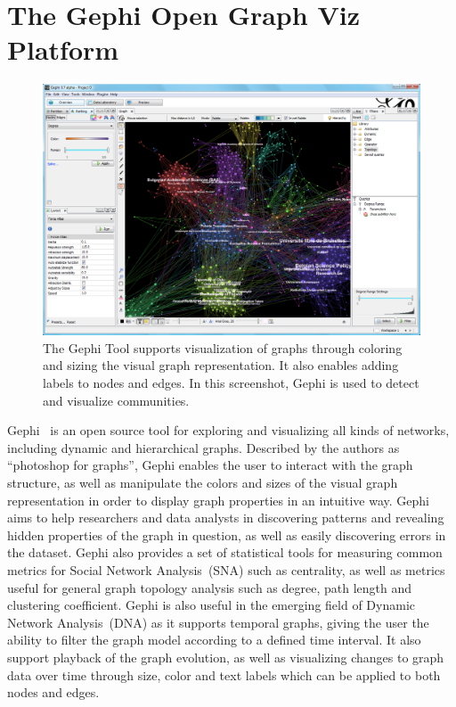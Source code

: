 \section{The Gephi Open Graph Viz Platform}

\begin{figure}
    \centering
    \includegraphics[width=\textwidth]{img/gephi1}
    \caption{The Gephi Tool supports
        visualization of graphs through coloring and sizing the visual
        graph
        representation. It also enables adding labels to nodes and
        edges. In
        this screenshot, Gephi is used to detect and visualize
    communities.}
\label{img:gephi1}
\end{figure}

Gephi~\cite{ICWSM09154} is an open source tool for exploring and
visualizing all kinds of networks, including dynamic and hierarchical
graphs. Described by the authors as ``photoshop for graphs'', Gephi
enables the user to interact with the graph structure, as well as
manipulate the colors and sizes of the visual graph representation in
order to display graph properties in an intuitive way. Gephi aims to
help researchers and data analysts in discovering patterns and revealing
hidden properties of the graph in question, as well as easily
discovering errors in the dataset. Gephi also provides a set of
statistical tools for measuring common metrics for Social Network
Analysis~(SNA) such as centrality, as well as metrics useful for general
graph topology analysis such as degree, path length and clustering
coefficient. Gephi is also useful in the emerging field of Dynamic
Network Analysis~(DNA)  as it supports temporal graphs, giving the user
the ability to filter the graph model according to a defined time
interval. It also support playback of the graph evolution, as well as
visualizing changes to graph data over time through size, color and text
labels which can be applied to both nodes and edges.

